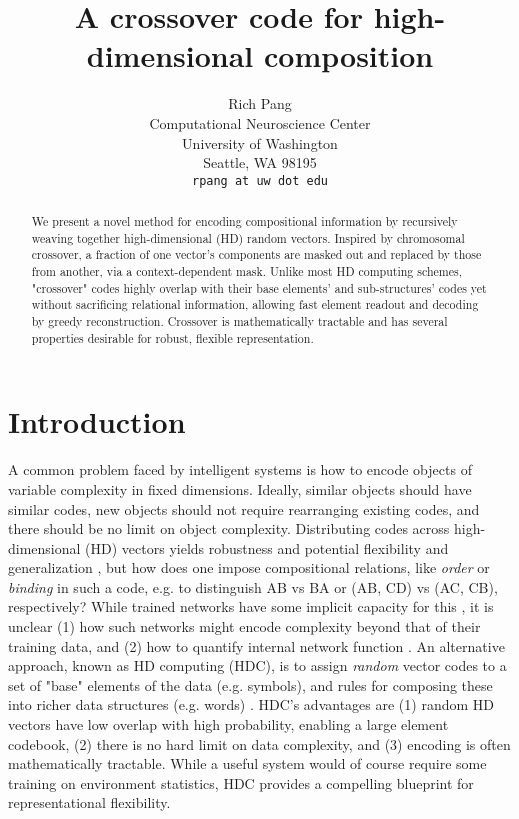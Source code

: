 \documentclass{article}
\title{A crossover code for high-dimensional composition}
\author{%
  Rich Pang\\
  Computational Neuroscience Center\\
  University of Washington\\
  Seattle, WA 98195\\
  \texttt{rpang at uw dot edu} \\
}
\begin{document}
\maketitle

\begin{abstract}
We present a novel method for encoding compositional information by recursively weaving together high-dimensional (HD) random vectors. Inspired by chromosomal crossover, a fraction of one vector's components are masked out and replaced by those from another, via a context-dependent mask. Unlike most HD computing schemes, "crossover" codes highly overlap with their base elements' and sub-structures' codes yet without sacrificing relational information, allowing fast element readout and decoding by greedy reconstruction. Crossover is mathematically tractable and has several properties desirable for robust, flexible representation.
\end{abstract}

\section{Introduction}

A common problem faced by intelligent systems is how to encode objects of variable complexity in fixed dimensions. Ideally, similar objects should have similar codes, new objects should not require rearranging existing codes, and there should be no limit on object complexity. Distributing codes across high-dimensional (HD) vectors yields robustness and potential flexibility and generalization \cite{Hinton:1984, Mikolov:2013}, but how does one impose compositional relations, like \textit{order} or \textit{binding} in such a code, e.g. to distinguish AB vs BA or (AB, CD) vs (AC, CB), respectively? While trained networks have some implicit capacity for this \cite{Bahdanau:2014, Luong:2015, Wu:2016}, it is unclear (1) how such networks might encode complexity beyond that of their training data, and (2) how to quantify internal network function \cite{Lipton:2017}. An alternative approach, known as HD computing (HDC), is to assign \textit{random} vector codes to a set of "base" elements of the data (e.g. symbols), and rules for composing these into richer data structures (e.g. words) \cite{Plate:1995, Kanerva:2009, Gayler}. HDC's advantages are (1) random HD vectors have low overlap with high probability, enabling a large element codebook, (2) there is no hard limit on data complexity, and (3) encoding is often mathematically tractable. While a useful system would of course require some training on environment statistics, HDC provides a compelling blueprint for representational flexibility.
\end{document}
